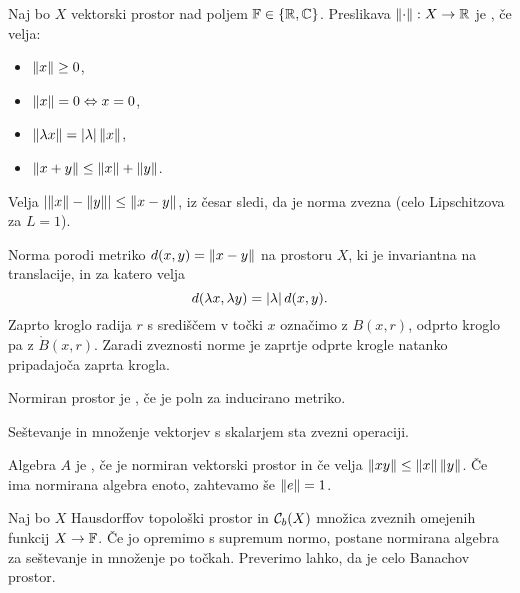 
\begin{definicija}
  Naj bo $X$ vektorski prostor nad poljem $\mathbb{F} \in \{\mathbb{R}, \mathbb{C}\}$.
  Preslikava $\left\lVert\cdot\right\rVert: X \to \mathbb{R}$ je , če velja:
  \begin{itemize}
  \item $\left\lVert x\right\rVert \ge 0$,
  \item $\left\lVert x\right\rVert = 0 \Leftrightarrow x = 0$,
  \item $\left\lVert\lambda x\right\rVert = \left| \lambda \right| \left\lVert x\right\rVert$,
  \item $\left\lVert x + y\right\rVert \le \left\lVert x\right\rVert + \left\lVert y\right\rVert$.
  \end{itemize}
\end{definicija}

\begin{opomba}
  Velja $\left| \left\lVert x\right\rVert - \left\lVert y\right\rVert \right| \le \left\lVert x - y\right\rVert$, iz česar sledi, da je
  norma zvezna (celo Lipschitzova za $L = 1$).
\end{opomba}

Norma porodi metriko $d(x,y) = \left\lVert x-y\right\rVert$ na prostoru $X$, ki je invariantna na
translacije, in za katero velja
\[
  d(\lambda x, \lambda y) = \left| \lambda \right| d(x,y).
\]
Zaprto kroglo radija $r$ s središčem v točki $x$ označimo z $B(x, r)$, odprto
kroglo pa z $\mathring{B}(x, r)$.
Zaradi zveznosti norme je zaprtje odprte krogle natanko pripadajoča zaprta
krogla.

\begin{definicija}
  Normiran prostor je , če je poln za inducirano metriko.
\end{definicija}

\begin{trditev}
  Seštevanje in množenje vektorjev s skalarjem sta zvezni operaciji.
\end{trditev}

\begin{definicija}
  Algebra $A$ je , če je normiran vektorski prostor in
  če velja $\left\lVert xy\right\rVert \le \left\lVert x\right\rVert \left\lVert y\right\rVert$.
  Če ima normirana algebra enoto, zahtevamo še $\left\lVert e\right\rVert = 1$.
\end{definicija}

\begin{primer}
  Naj bo $X$ Hausdorffov topološki prostor in $\mathcal{C}_b(X)$ množica zveznih
  omejenih funkcij $X \to \mathbb{F}$.
  Če jo opremimo s supremum normo, postane normirana algebra za seštevanje in
  množenje po točkah.
  Preverimo lahko, da je celo Banachov prostor.
\end{primer}

